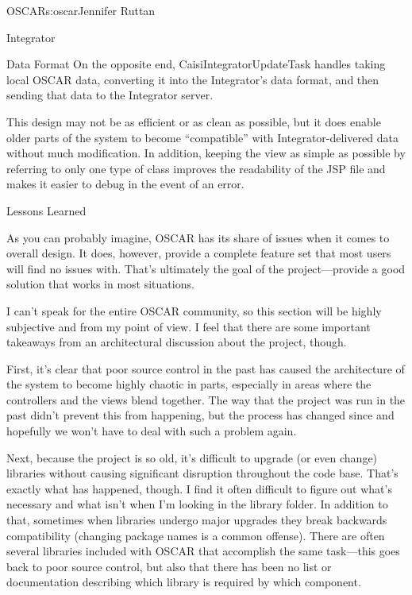 \begin{aosachapter}{OSCAR}{s:oscar}{Jennifer Ruttan}
\begin{aosasect1}{Integrator}
\begin{aosasect2}{Data Format}
On the opposite end, CaisiIntegratorUpdateTask handles taking local
OSCAR data, converting it into the Integrator's data format, and then
sending that data to the Integrator server.

This design may not be as efficient or as clean as possible, but it
does enable older parts of the system to become ``compatible'' with
Integrator-delivered data without much modification. In addition,
keeping the view as simple as possible by referring to only one type
of class improves the readability of the JSP file and makes it easier
to debug in the event of an error.

\end{aosasect2}

\end{aosasect1}

\begin{aosasect1}{Lessons Learned}

As you can probably imagine, OSCAR has its share of issues when it
comes to overall design. It does, however, provide a complete feature
set that most users will find no issues with. That's ultimately the
goal of the project---provide a good solution that works in most
situations.

I can't speak for the entire OSCAR community, so this section will be
highly subjective and from my point of view. I feel that there are
some important takeaways from an architectural discussion about the
project, though.

First, it's clear that poor source control in the past has caused the
architecture of the system to become highly chaotic in parts,
especially in areas where the controllers and the views blend
together. The way that the project was run in the past didn't prevent
this from happening, but the process has changed since and hopefully
we won't have to deal with such a problem again.

Next, because the project is so old, it's difficult to upgrade (or
even change) libraries without causing significant disruption
throughout the code base. That's exactly what has happened, though. I
find it often difficult to figure out what's necessary and what isn't
when I'm looking in the library folder. In addition to that, sometimes
when libraries undergo major upgrades they break backwards
compatibility (changing package names is a common offense). There are
often several libraries included with OSCAR that accomplish the same
task---this goes back to poor source control, but also that there has
been no list or documentation describing which library is required by
which component.


\end{aosasect1}
\end{aosachapter}
